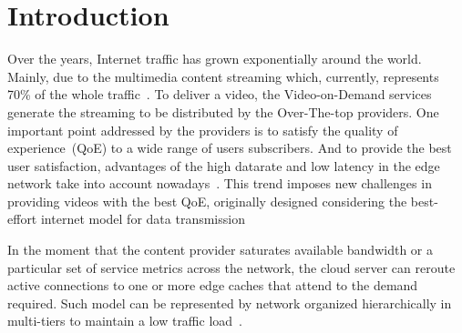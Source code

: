 \section{Introduction}
\label{sec:introduction}


Over the years, Internet traffic has grown exponentially around the world. Mainly, due to the multimedia content streaming which, currently, represents 70\% of the whole traffic~\cite{cisco:forecast}. To deliver a video, the Video-on-Demand services generate the streaming to be distributed by the Over-The-top providers. One important point addressed by the providers is to satisfy the quality of experience~(QoE) to a wide range of users subscribers. And to provide the best user satisfaction, advantages of the high datarate and low latency in the edge network take into account nowadays~\cite{gamaUCC2019,DBLP:CoRR:2021,ye:ITC17}. This trend imposes new challenges in providing videos with the best QoE, originally designed considering the best-effort internet model for data transmission

In the moment that the content provider saturates available bandwidth or a particular set of service metrics across the network, the cloud server can reroute active connections to one or more edge caches that attend to the demand required. Such model can be represented by network organized hierarchically in multi-tiers to maintain a low traffic load~\cite{rosarioSENSORS2018}.

